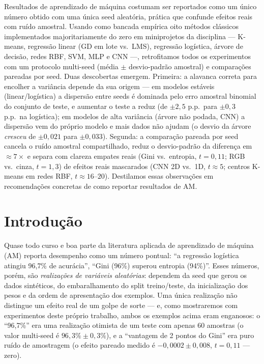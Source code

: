 \documentclass[12pt]{article}
\begin{document}
\begin{resumo}
  Resultados de aprendizado de máquina costumam ser reportados como um único
  número obtido com uma única seed aleatória, prática que confunde efeitos
  reais com ruído amostral. Usando como bancada empírica oito métodos
  clássicos implementados majoritariamente do zero em miniprojetos da
  disciplina --- K-means, regressão linear (GD em lote vs.\ LMS), regressão
  logística, árvore de decisão, redes RBF, SVM, MLP e CNN ---, retrofitamos
  todos os experimentos com um protocolo multi-seed (média $\pm$
  desvio-padrão amostral) e comparações pareadas por seed. Duas descobertas
  emergem. Primeira: a alavanca correta para encolher a variância depende da
  sua origem --- em modelos estáveis (linear/logística) a dispersão entre
  seeds é dominada pelo erro amostral binomial do conjunto de teste, e
  aumentar o teste a reduz (de $\pm 2{,}5$ p.p.\ para $\pm 0{,}3$ p.p.\ na
  logística); em modelos de alta variância (árvore não podada, CNN) a
  dispersão vem do próprio modelo e mais dados não ajudam (o desvio da árvore
  \emph{cresceu} de $\pm 0{,}021$ para $\pm 0{,}033$). Segunda: a comparação
  pareada por seed cancela o ruído amostral compartilhado, reduz o
  desvio-padrão da diferença em $\approx 7\times$ e separa com clareza
  empates reais (Gini vs.\ entropia, $t=0{,}11$; RGB vs.\ cinza, $t=1{,}3$)
  de efeitos reais mascarados (CNN 2D vs.\ 1D, $t\approx 5$; centros K-means
  em redes RBF, $t\approx 16$--$20$). Destilamos essas observações em
  recomendações concretas de como reportar resultados de AM.
\end{resumo}

\section{Introdução}\label{sec:intro}

Quase todo curso e boa parte da literatura aplicada de aprendizado de máquina
(AM) reporta desempenho como um número pontual: ``a regressão logística
atingiu 96{,}7\% de acurácia'', ``Gini (96\%) superou entropia (94\%)''.
Esses números, porém, são \emph{realizações de variáveis aleatórias}: dependem
da seed que gerou os dados sintéticos, do embaralhamento do split
treino/teste, da inicialização dos pesos e da ordem de apresentação dos
exemplos. Uma única realização não distingue um efeito real de um golpe de
sorte --- e, como mostraremos com experimentos deste próprio trabalho, ambos
os exemplos acima eram enganosos: o ``96{,}7\%'' era uma realização otimista
de um teste com apenas 60 amostras (o valor multi-seed é $96{,}3\% \pm
0{,}3\%$), e a ``vantagem de 2 pontos do Gini'' era puro ruído de amostragem
(o efeito pareado medido é $-0{,}0002 \pm 0{,}008$, $t=0{,}11$ --- zero).
\end{document}
